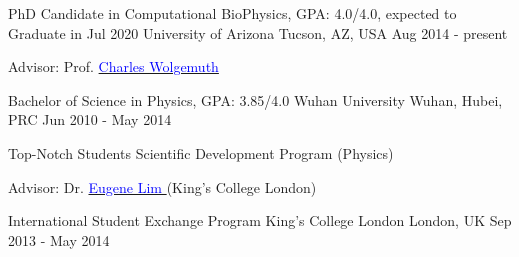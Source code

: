 
\begin{cventries}
  \cventry
    {PhD Candidate in Computational BioPhysics, GPA: 4.0/4.0, expected to Graduate in Jul 2020} %
    {University of Arizona} %
    {Tucson, AZ, USA} %
    {Aug 2014 - present} %
    {  \begin{cvitems} %
         \item {Advisor: Prof. \href{http://www.physics.arizona.edu/~wolg}{\textcolor{blue}{Charles Wolgemuth} } }
      \end{cvitems}
    }

  \cventry
    {Bachelor of Science in Physics, GPA: 3.85/4.0} %
    {Wuhan University} %
    {Wuhan, Hubei, PRC} %
    {Jun 2010 - May 2014} %
    {  \begin{cvitems} %
         \item {Top-Notch Students Scientific Development Program (Physics)}
         \item {Advisor: Dr. \href{https://www.kcl.ac.uk/people/eugene-lim}{\textcolor{blue}{Eugene Lim} }(King's College London) }
      \end{cvitems}
    }
   
  \cventry
    {International Student Exchange Program} %
    {King's College London} %
    {London, UK} %
    {Sep 2013 - May 2014} %
    {}    
\end{cventries}
